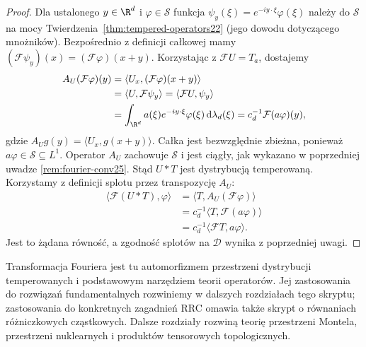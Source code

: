 \begin{proof}
Dla ustalonego $y\in\R^d$ i $\varphi\in\mathcal S$
funkcja $\psi_y(\xi)=e^{-iy\cdot\xi}\varphi(\xi)$
należy do $\mathcal S$ na mocy
Twierdzenia~\ref{thm:tempered-operators22}
(jego dowodu dotyczącego mnożników).
Bezpośrednio z definicji całkowej mamy
$(\mathcal F\psi_y)(x)=(\mathcal F\varphi)(x+y)$.
Korzystając z $\mathcal FU=T_a$, dostajemy
\[
 \begin{aligned}
 A_U(\mathcal F\varphi)(y)
 &=\langle U_x,(\mathcal F\varphi)(x+y)\rangle\\
 &=\langle U,\mathcal F\psi_y\rangle
 =\langle\mathcal FU,\psi_y\rangle\\
 &=\int_{\R^d}a(\xi)e^{-iy\cdot\xi}\varphi(\xi)
 \,\mathrm d\lambda_d(\xi)
 =c_d^{-1}\mathcal F(a\varphi)(y),
 \end{aligned}
\]
gdzie $A_Ug(y)=\langle U_x,g(x+y)\rangle$.
Całka jest bezwzględnie zbieżna, ponieważ
$a\varphi\in\mathcal S\subseteq L^1$.
Operator $A_U$ zachowuje $\mathcal S$ i jest ciągły,
jak wykazano w poprzedniej uwadze
\ref{rem:fourier-conv25}. Stąd $U*T$ jest dystrybucją temperowaną.
Korzystamy z definicji splotu przez transpozycję $A_U$:
\[
\begin{aligned}
 \langle\mathcal F(U*T),\varphi\rangle
 &=\langle T,A_U(\mathcal F\varphi)\rangle\\
 &=c_d^{-1}\langle T,\mathcal F(a\varphi)\rangle\\
 &=c_d^{-1}\langle\mathcal F T,a\varphi\rangle .
\end{aligned}
\]
Jest to żądana równość, a zgodność splotów na
$\mathcal D$ wynika z poprzedniej uwagi.
\end{proof}

\begin{uwaga}
\label{rem:scope22}
Transformacja Fouriera jest tu automorfizmem przestrzeni
dystrybucji temperowanych i podstawowym narzędziem teorii
operatorów. Jej zastosowania do rozwiązań fundamentalnych rozwiniemy
w dalszych rozdziałach tego skryptu; zastosowania do
konkretnych zagadnień RRC omawia także skrypt o równaniach
różniczkowych cząstkowych.
Dalsze rozdziały rozwiną teorię przestrzeni Montela,
przestrzeni nuklearnych i produktów tensorowych topologicznych.
\end{uwaga}

